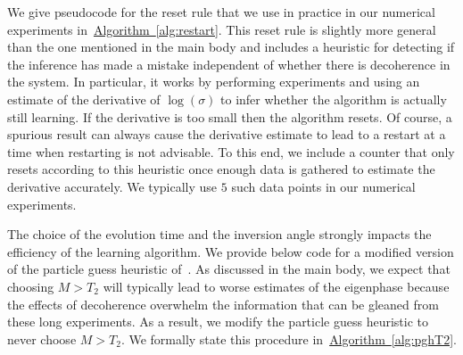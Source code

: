 \documentclass[aps,pra,amsmath,twocolumn,amssymb,superscriptaddress]{revtex4-1}
\newcommand{\alg}[1]{\hyperref[alg:#1]{Algorithm~\ref*{alg:#1}}}
\begin{document}
We give pseudocode for the reset rule that we use in practice in our numerical experiments in~\alg{restart}.  This reset rule is slightly more general than the one mentioned in the main body and includes a heuristic for detecting if the inference has made a mistake independent of whether there is decoherence in the system.  In particular, it works by performing experiments and using an estimate of the derivative of $\log(\sigma)$ to infer whether the algorithm is actually still learning.  If the derivative is too small then the algorithm resets.  Of course, a spurious result can always cause the derivative estimate to lead to a restart at a time when restarting is not advisable.  To this end, we include a counter that only resets according to this heuristic once enough data is gathered to estimate the derivative accurately.  We typically use $5$ such data points in our numerical experiments.

The choice of the evolution time and the inversion angle strongly impacts the efficiency of the learning algorithm.  We provide below code for a modified version of the
particle guess heuristic of~\cite{wiebe_hamiltonian_2014}.  As discussed in the main body, we expect that choosing $M> T_2$ will typically lead to worse estimates of the eigenphase because the effects of decoherence overwhelm the information that can be gleaned from these long experiments.  As a result, we modify the particle guess heuristic  to never choose $M> T_2$.  We formally state this procedure in~\alg{pghT2}.

\newpage
\end{document}
